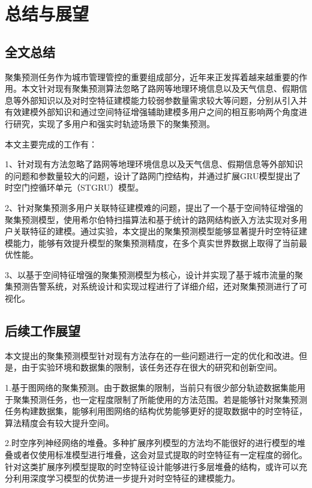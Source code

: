 \documentclass[master]{thesis-uestc}
\begin{document}
\chapter{总结与展望}

\section{全文总结}
聚集预测任务作为城市管理管控的重要组成部分，近年来正发挥着越来越重要的作用。本文针对现有聚集预测算法忽略了路网等地理环境信息以及天气信息、假期信息等外部知识以及对时空特征建模能力较弱参数量需求较大等问题，分别从引入并有效建模外部知识和通过空间特征增强辅助建模多用户之间的相互影响两个角度进行研究，实现了多用户和强实时轨迹场景下的聚集预测。

本文主要完成的工作有：

1、针对现有方法忽略了路网等地理环境信息以及天气信息、假期信息等外部知识的问题和参数量较大的问题，设计了路网门控结构，并通过扩展GRU模型提出了时空门控循环单元（STGRU）模型。

2、针对聚集预测多用户关联特征建模难的问题，提出了一个基于空间特征增强的聚集预测模型，使用希尔伯特扫描算法和基于统计的路网结构嵌入方法实现对多用户关联特征的建模。通过实验，本文提出的聚集预测模型能够显著提升时空特征建模能力，能够有效提升模型的聚集预测精度，在多个真实世界数据上取得了当前最优性能。

3、以基于空间特征增强的聚集预测模型为核心，设计并实现了基于城市流量的聚集预测告警系统，对系统设计和实现过程进行了详细介绍，还对聚集预测进行了可视化。


\section{后续工作展望}
本文提出的聚集预测模型针对现有方法存在的一些问题进行一定的优化和改进。但是，由于实验环境和数据集的限制，该任务还存在很大的研究和创新空间。

1.基于图网络的聚集预测。由于数据集的限制，当前只有很少部分轨迹数据集能用于聚集预测任务，也一定程度限制了所能使用的方法范围。若是能够针对聚集预测任务构建数据集，能够利用图网络的结构优势能够更好的提取数据中的时空特征，算法精度会有较大提升空间。

2.时空序列神经网络的堆叠。多种扩展序列模型的方法均不能很好的进行模型的堆叠或者仅使用标准模型进行堆叠，这会对显式提取的时空特征有一定程度的弱化。针对这类扩展序列模型提取的时空特征设计能够进行多层堆叠的结构，或许可以充分利用深度学习模型的优势进一步提升对时空特征的建模能力。

\thesisacknowledgement

\thesisappendix



%
% 
%
% 
% 
%

\end{document}
